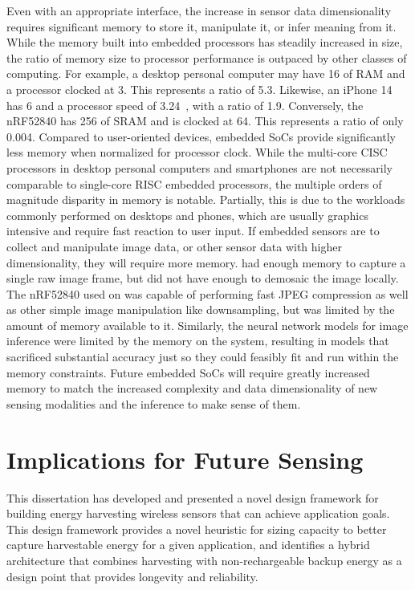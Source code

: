 Even with an appropriate interface, the increase in sensor data dimensionality requires significant memory to store it, manipulate it, or infer meaning from it.
While the memory built into embedded processors has steadily increased in size, the ratio of memory size to processor performance is outpaced by other classes of computing.
For example, a desktop personal computer may have
16\ssi{\giga\byte} of RAM and a processor clocked at 3\ssi{\giga\hertz}.
This represents a ratio of 5.3\ssi[per-mode=symbol]{\byte\per\hertz}.
Likewise, an iPhone 14 has 6\ssi{\giga\byte} and a processor speed of 3.24\ssi{\giga\hertz}~\cite{iphone14}, with a ratio of 1.9\ssi[per-mode=symbol]{\byte\per\hertz}.
Conversely, the nRF52840
has 256\ssi{\kilo\byte} of SRAM and
is clocked at 64\ssi{\mega\hertz}. This represents a ratio of only \num{0.004}\ssi[per-mode=symbol]{\byte\per\hertz}.
Compared to user-oriented devices, embedded SoCs provide significantly less memory when normalized for processor clock.
While the multi-core CISC processors in desktop personal computers and smartphones are not necessarily comparable to single-core RISC embedded processors, the multiple orders of magnitude disparity in memory is notable.
Partially, this is due to the workloads commonly performed on desktops and phones, which are usually graphics intensive and require fast reaction to user input.
If embedded sensors are to collect and manipulate image data, or other sensor data with higher dimensionality, they will require more memory.
\namec had enough memory to capture a single raw image frame, but did not have enough to demosaic the image locally.
The nRF52840 used on \namec was capable of performing fast JPEG compression as well as other simple image manipulation like downsampling, but was limited by the amount of memory available to it.
Similarly, the neural network models for image inference were limited by the memory on the system, resulting in models that sacrificed substantial accuracy just so they could feasibly fit and run within the memory constraints.
Future embedded SoCs will require greatly increased memory to match the increased complexity and data dimensionality of new sensing modalities and the inference to make sense of them.

\section{Implications for Future Sensing}
This dissertation has developed and presented a novel design framework for building energy harvesting wireless sensors that can achieve application goals.
This design framework provides a novel heuristic for sizing capacity to better capture harvestable energy for a given application, and identifies a hybrid architecture that combines harvesting with non-rechargeable backup energy as a design point that provides longevity and reliability.


